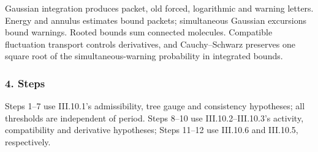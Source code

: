 \documentclass[
  letterpaper,
  11pt]{article}
\begin{document}
Gaussian integration produces packet, old forced, logarithmic and
warning letters. Energy and annulus estimates bound packets;
simultaneous Gaussian excursions bound warnings. Rooted bounds sum
connected molecules. Compatible fluctuation transport controls
derivatives, and Cauchy--Schwarz preserves one square root of the
simultaneous-warning probability in integrated bounds.

\subsubsection{4. Steps}\label{steps-12}

Steps 1--7 use III.10.1's admissibility, tree gauge and consistency
hypotheses; all thresholds are independent of period. Steps 8--10 use
III.10.2--III.10.3's activity, compatibility and derivative hypotheses;
Steps 11--12 use III.10.6 and III.10.5, respectively.
\end{document}
